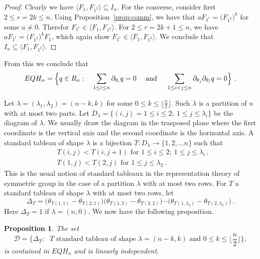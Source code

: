 \documentclass[11pt]{amsart}
\newtheorem{prop}[theorem]{Proposition}
\theoremstyle{definition}
\numberwithin{equation}{section}
\begin{document}
\begin{proof} Clearly we have $ \langle F_1, F_{1^2}  \rangle \subseteq I_n$. For the  converse, consider first $2\le r=2k\le n$. Using Proposition~\ref{prop:comm}, we have that
$aF_{1^r} = \big(F_{1^2}\big)^k$ for some $a\ne 0$. Therefor $F_{1^r} \in \langle F_1, F_{1^2}  \rangle$. For $2\le r=2k+1\le n$, we have $aF_{1^r} = \big(F_{1^2}\big)^kF_1$, which again show $F_{1^r} \in \langle F_1, F_{1^2}  \rangle$. We conclude that $I_n\subseteq  \langle F_1, F_{1^2}  \rangle$. 
\end{proof}

From this we conclude that 
\begin{equation}\label{eq:defEQH}
EQH_n =  \Big\{ q \in R_n :  \quad\sum_{1\le i\le n} \partial_{\theta_i}q= 0 \quad\hbox{ and  }\quad \sum_{1\le i<j\le n} \partial_{\theta_j}\partial_{\theta_i}q= 0 \Big\}~.
\end{equation}

Let $\lambda=(\lambda_1,\lambda_2)=(n-k,k)$ for some $0\le k\le \lfloor \frac{n}{2}\rfloor$. Such $\lambda$ is a partition of $n$ with at  most two parts.
Let  $D_\lambda =  \big\{ (i,j) = 1\le i \le 2;\ 1\le j\le \lambda_i\big\}$ be the diagram of $\lambda$. We usually draw  the diagram in the trasposed plane where the first coordinate is the vertical axis and the second coordinate is the horizontal axis. A standard tableau of shape $\lambda$ is a bijection $T\colon D_\lambda\to \{1,2,\ldots n\}$ such that
\begin{align*}
 &T(i,j)< T(i,j+1) \text{ for } 1\le i\le 2; \ 1\le j\le \lambda_i\,,\\
 &T(1,j)< T(2,j) \text{ for } 1\le j\le \lambda_2\,.
 \end{align*}
This is the usual notion of standard tableaux in the representation theory of symmetric group in the case of a partition $\lambda$ with at most two rows.
For $T$ a standard tableau of shape $\lambda$ with at most two rows, let
  $$\Delta_T = \big(\theta_{T(1,1)}-\theta_{T(2,1)}\big)\big(\theta_{T(1,2)}-\theta_{T(2,2)}\big)\cdots \big(\theta_{T(1,\lambda_2)}-\theta_{T(2,\lambda_2)}\big)\,.
  $$
Here $\Delta_T=1$ if $\lambda=(n,0)$. We now have the following proposition.

\begin{prop}\label{harmbasis}
The set
$${\mathcal D} =\big\{ \Delta_T: \text{ $T$  standard tableau of shape $\lambda=(n-k,k)$ and $0\le k\le \lfloor \frac{n}{2}\rfloor$}\big\},
$$
is contained in $EQH_n $ and is  linearly independent.
\end{prop}
\end{document}
